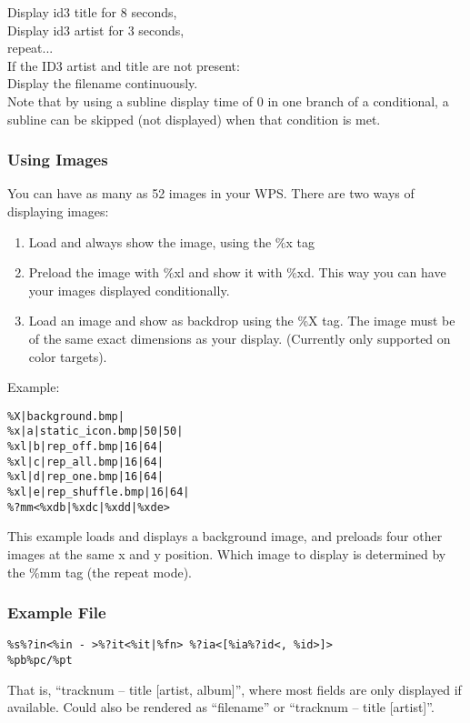 Display id3 title for 8 seconds,\\

Display id3 artist for 3 seconds,\\

repeat...\\

If the ID3 artist and title are not present:\\

Display the filename continuously.\\

Note that by using a subline display time of 0 in one branch of a conditional,
a subline can be skipped (not displayed) when that condition is met. 


\subsubsection{Using Images}
You can have as many as 52 images in your WPS. There are two ways of 
displaying images:
\begin{enumerate}
  \item Load and always show the image, using the \%x tag
  \item Preload the image with \%xl and show it with \%xd. This way you can 
        have your images displayed conditionally.
  \item Load an image and show as backdrop using the \%X tag. The image must 
        be of the same exact dimensions as your display. (Currently only
        supported on color targets).
\end{enumerate}
Example:
\begin{verbatim}
%X|background.bmp|
%x|a|static_icon.bmp|50|50|
%xl|b|rep_off.bmp|16|64|
%xl|c|rep_all.bmp|16|64|
%xl|d|rep_one.bmp|16|64|
%xl|e|rep_shuffle.bmp|16|64|
%?mm<%xdb|%xdc|%xdd|%xde>
\end{verbatim}
This example loads and displays a background image, and preloads four other
images at the same x and y position. Which image to display is determined by
the \%mm tag (the repeat mode).

\subsubsection{Example File}
\begin{verbatim}
%s%?in<%in - >%?it<%it|%fn> %?ia<[%ia%?id<, %id>]>
%pb%pc/%pt
\end{verbatim}
That is, ``tracknum -- title [artist, album]'', where most fields are only
displayed if available. Could also be rendered as ``filename'' or ``tracknum --
title [artist]''.

